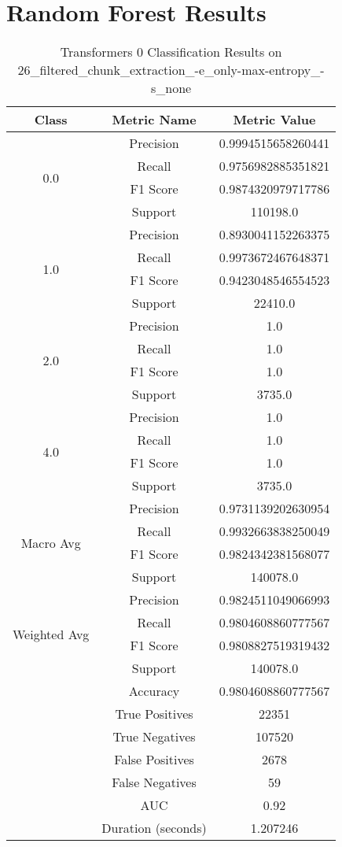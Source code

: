 \section{Random Forest Results}
\begin{longtable}{|c|c|c|}
    \caption{Transformers 0 Classification Results on 26\_filtered\_chunk\_extraction\_-e\_only-max-entropy\_-s\_none} \label{tab:transformers_0_classifiers_results} \\
    \hline
    Class & Metric Name & Metric Value \\
    \hline
    \multirow{4}{*}{0.0} & Precision & 0.9994515658260441 \\
     & Recall & 0.9756982885351821 \\
     & F1 Score & 0.9874320979717786 \\
     & Support & 110198.0 \\
    \hline
    \multirow{4}{*}{1.0} & Precision & 0.8930041152263375 \\
     & Recall & 0.9973672467648371 \\
     & F1 Score & 0.9423048546554523 \\
     & Support & 22410.0 \\
    \hline
    \multirow{4}{*}{2.0} & Precision & 1.0 \\
     & Recall & 1.0 \\
     & F1 Score & 1.0 \\
     & Support & 3735.0 \\
    \hline
    \multirow{4}{*}{4.0} & Precision & 1.0 \\
     & Recall & 1.0 \\
     & F1 Score & 1.0 \\
     & Support & 3735.0 \\
    \hline
    \multirow{4}{*}{Macro Avg} & Precision & 0.9731139202630954 \\
     & Recall & 0.9932663838250049 \\
     & F1 Score & 0.9824342381568077 \\
     & Support & 140078.0 \\
    \hline
    \multirow{4}{*}{Weighted Avg} & Precision & 0.9824511049066993 \\
     & Recall & 0.9804608860777567 \\
     & F1 Score & 0.9808827519319432 \\
     & Support & 140078.0 \\
    \hline
    & Accuracy & 0.9804608860777567 \\ \hline
    & True Positives & 22351 \\ \hline
    & True Negatives & 107520 \\ \hline
    & False Positives & 2678 \\ \hline
    & False Negatives & 59 \\ \hline
    & AUC & 0.92 \\ \hline
    & Duration (seconds) & 1.207246 \\ \hline
    \end{longtable}
    
